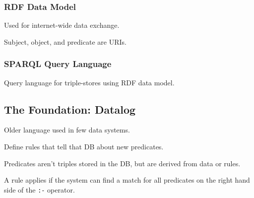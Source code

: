 \documentclass[11pt]{article}
\begin{document}
\subsubsection{RDF Data Model}
\label{sec:orgf36b584}
Used for internet-wide data exchange.

Subject, object, and predicate are URIs.
\subsubsection{SPARQL Query Language}
\label{sec:org395a957}
Query language for triple-stores using RDF data model.
\subsection{The Foundation: Datalog}
\label{sec:org1e9e96f}
Older language used in few data systems.

Define rules that tell that DB about new predicates.

Predicates aren't triples stored in the DB, but are
derived from data or rules.

A rule applies if the system can find a match for all
predicates on the right hand side of the \texttt{:-} operator.
\end{document}

